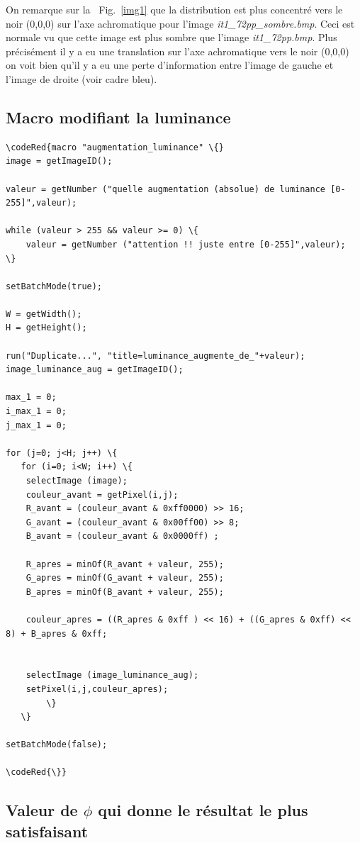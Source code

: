\documentclass[a4paper,10pt]{article}
\begin{document}
On remarque sur la ~Fig.~\ref{img1} que la distribution est plus concentr\'e vers le noir (0,0,0) sur l'axe achromatique pour l'image \emph{it1\_72pp\_sombre.bmp}. Ceci est normale vu que cette image est plus sombre que l'image \emph{it1\_72pp.bmp}. Plus pr\'ecis\'ement il y a eu une translation sur l'axe achromatique vers le noir (0,0,0) on voit bien qu'il y a eu une perte d'information entre l'image de gauche et l'image de droite (voir cadre bleu).


\newpage

\subsection{Macro modifiant la luminance}
\begin{Verbatim}[commandchars=\\\{\}]
\codeRed{macro "augmentation_luminance" \{}
image = getImageID();

valeur = getNumber ("quelle augmentation (absolue) de luminance [0-255]",valeur);

while (valeur > 255 && valeur >= 0) \{
	valeur = getNumber ("attention !! juste entre [0-255]",valeur);
\}

setBatchMode(true);

W = getWidth();
H = getHeight();

run("Duplicate...", "title=luminance_augmente_de_"+valeur);
image_luminance_aug = getImageID();

max_1 = 0; 
i_max_1 = 0;
j_max_1 = 0;

for (j=0; j<H; j++) \{
   for (i=0; i<W; i++) \{
	selectImage (image);
	couleur_avant = getPixel(i,j);
	R_avant = (couleur_avant & 0xff0000) >> 16;
	G_avant = (couleur_avant & 0x00ff00) >> 8;
	B_avant = (couleur_avant & 0x0000ff) ;
	
	R_apres = minOf(R_avant + valeur, 255);
	G_apres = minOf(G_avant + valeur, 255);
	B_apres = minOf(B_avant + valeur, 255);

	couleur_apres = ((R_apres & 0xff ) << 16) + ((G_apres & 0xff) << 8) + B_apres & 0xff;


	selectImage (image_luminance_aug);
	setPixel(i,j,couleur_apres);
      	\}
   \}

setBatchMode(false);

\codeRed{\}}
\end{Verbatim}


\subsection{Valeur de $\phi$ qui donne le r\'esultat le plus satisfaisant}
\end{document}

